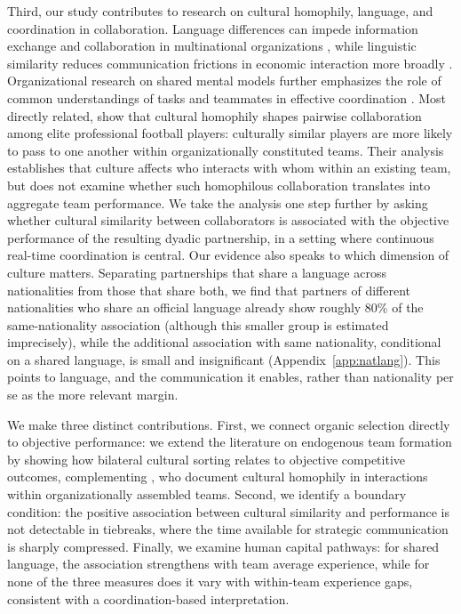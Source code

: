 \documentclass[10pt]{article}
\begin{document}
Third, our study contributes to research on cultural homophily, language, and coordination in collaboration. Language differences can impede information exchange and collaboration in multinational organizations \citep{marschanpiekkari1999,feelyharzing2003}, while linguistic similarity reduces communication frictions in economic interaction more broadly \citep{melitztoubal2014}. Organizational research on shared mental models further emphasizes the role of common understandings of tasks and teammates in effective coordination \citep{cannonbowers1993,klimoski1994,mathieu2000}. Most directly related, \citet{bekesottaviano2025} show that cultural homophily shapes pairwise collaboration among elite professional football players: culturally similar players are more likely to pass to one another within organizationally constituted teams. Their analysis establishes that culture affects who interacts with whom within an existing team, but does not examine whether such homophilous collaboration translates into aggregate team performance. We take the analysis one step further by asking whether cultural similarity between collaborators is associated with the objective performance of the resulting dyadic partnership, in a setting where continuous real-time coordination is central. Our evidence also speaks to which dimension of culture matters. Separating partnerships that share a language across nationalities from those that share both, we find that partners of different nationalities who share an official language already show roughly 80\% of the same-nationality association (although this smaller group is estimated imprecisely), while the additional association with same nationality, conditional on a shared language, is small and insignificant (Appendix~\ref{app:natlang}). This points to language, and the communication it enables, rather than nationality per se as the more relevant margin.



We make three distinct contributions. First, we connect organic selection directly to objective performance: we extend the literature on endogenous team formation by showing how bilateral cultural sorting relates to objective competitive outcomes, complementing \citet{bekesottaviano2025}, who document cultural homophily in interactions within organizationally assembled teams. Second, we identify a boundary condition: the positive association between cultural similarity and performance is not detectable in tiebreaks, where the time available for strategic communication is sharply compressed. Finally, we examine human capital pathways: for shared language, the association strengthens with team average experience, while for none of the three measures does it vary with within-team experience gaps, consistent with a coordination-based interpretation.
\end{document}
